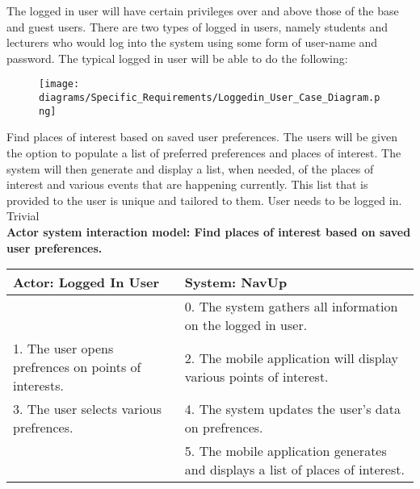 The logged in user will have certain privileges over and above those of the base and guest users. There are two types of logged in users, namely students and lecturers who would log into the system using some form of user-name and password. The typical logged in user will be able to do the following:

\begin{figure} 
  \texttt{[image: diagrams/Specific\_Requirements/Loggedin\_User\_Case\_Diagram.png]}
\end{figure}

\FuncReq
{Find places of interest based on saved user preferences.}
{The users will be given the option to populate a list of preferred preferences and places of interest. The system will then generate and display a list, when needed, of the  places of interest and various events that are happening currently. This list that is provided to the user is unique and tailored to them.}
{User needs to be logged in.}
{Trivial}
\\
    \textbf{Actor system interaction model: Find places of interest based on saved user preferences. }\\
    \begin{tabular}{ | p{6cm} | p{6cm} |}
    \hline
    Actor: Logged In User & System: NavUp \\ \hline
    & 0. The system gathers all information on the logged in user.\\ \hline
    1. The user opens prefrences on points of interests. & 2. The mobile application will display various points of interest.\\ \hline
    3. The user selects various prefrences. & 4. The system updates the user's data on prefrences. \\ \hline
    & 5. The mobile application generates and displays a list of places of interest. \\ \hline
    \end{tabular}
\\
\bigskip

